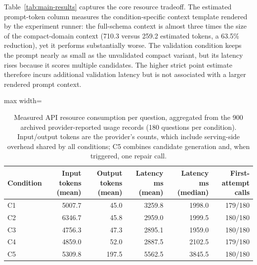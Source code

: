 \documentclass[cmc,article,submit,moreauthors,pdftex]{Definitions/tsp}
\begin{document}
Table~\ref{tab:main-results} captures the core resource tradeoff. The estimated prompt-token column measures the condition-specific context template rendered by the experiment runner: the full-schema context is almost three times the size of the compact-domain context (710.3 versus 259.2 estimated tokens, a 63.5\% reduction), yet it performs substantially worse. The validation condition keeps the prompt nearly as small as the unvalidated compact variant, but its latency rises because it scores multiple candidates. The higher strict point estimate therefore incurs additional validation latency but is not associated with a larger rendered prompt context.

\begin{table}[H]
\tablesize{\small}
\caption{Measured API resource consumption per question, aggregated from the 900 archived provider-reported usage records (180 questions per condition). Input/output tokens are the provider's counts, which include serving-side overhead shared by all conditions; C5 combines candidate generation and, when triggered, one repair call.}
\label{tab:real-tokens}
\centering
\begin{adjustbox}{max width=\textwidth}
\begin{tabular}{lrrrrr}
\toprule
\textbf{Condition} & \textbf{Input tokens (mean)} & \textbf{Output tokens (mean)} & \textbf{Latency ms (mean)} & \textbf{Latency ms (median)} & \textbf{First-attempt calls} \\
\midrule
C1 & 5007.7 & 45.0 & 3259.8 & 1998.0 & 179/180 \\
C2 & 6346.7 & 45.8 & 2959.0 & 1999.5 & 180/180 \\
C3 & 4756.3 & 47.3 & 2895.1 & 1959.0 & 180/180 \\
C4 & 4859.0 & 52.0 & 2887.5 & 2102.5 & 179/180 \\
C5 & 5309.8 & 197.5 & 5562.5 & 3845.5 & 180/180 \\
\bottomrule
\end{tabular}
\end{adjustbox}
\end{table}
\end{document}
